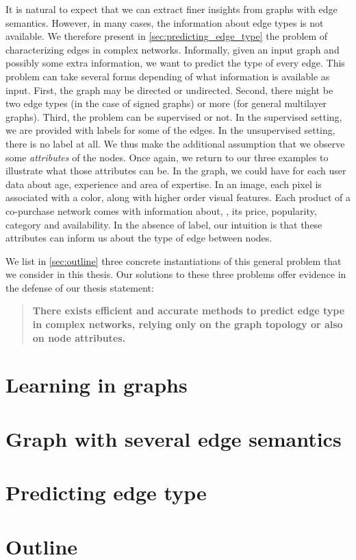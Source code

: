 It is natural to expect that we can extract finer insights from graphs with edge semantics. However,
in many cases, the information about edge types is not available. We therefore present in
\autoref{sec:predicting_edge_type} the problem of characterizing edges in complex networks.
Informally, given an input graph and possibly some extra information, we want to predict the type of
every edge. This problem can take several forms depending of what information is available as input.
First, the graph may be directed or undirected. Second, there might be two edge types (in the case of
signed graphs) or more (for general multilayer graphs). Third, the problem can be supervised or not.
In the supervised setting, we are provided with labels for some of the edges. In the unsupervised
setting, there is no label at all. We thus make the additional assumption that we observe some
\emph{attributes} of the nodes. Once again, we return to our three examples to illustrate what
those attributes can be. In the \wik{} graph, we could have for each user data about age, experience and
area of expertise. In an image, each pixel is associated with a color, along with higher order
visual features. Each product of a co-purchase network comes with information about, \eg{}, its price,
popularity, category and availability. In the absence of label, our intuition is that these
attributes can inform us about the type of edge between nodes. 

\medskip

We list in \autoref{sec:outline} three concrete instantiations of this general problem that we
consider in this thesis. Our solutions to these three problems offer evidence in the defense of our
thesis statement:
\begin{quote}
\bf
There exists efficient and accurate methods to predict edge type in complex networks, relying
only on the graph topology or also on node attributes.
\end{quote}

\section{Learning in graphs}
\label{sec:learning_in_graphs}


\section{Graph with several edge semantics}
\label{sec:edge_semantics}


\section{Predicting edge type}
\label{sec:predicting_edge_type}


\section{Outline}
\label{sec:outline}

